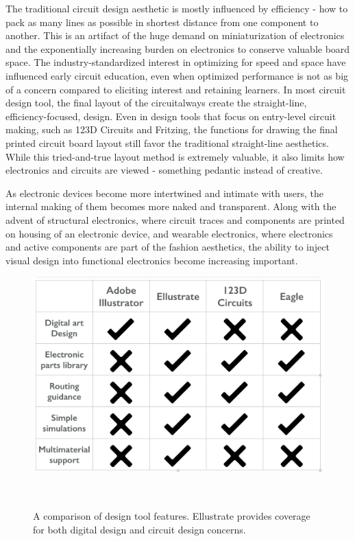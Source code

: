 \documentclass{sigchi}
\begin{document}

The traditional circuit design aesthetic is mostly influenced by efficiency - how to pack as many lines as possible in shortest distance from one component to another. 
This is an artifact of the huge demand on miniaturization of electronics and the exponentially increasing burden on electronics to conserve valuable board space. 
The industry-standardized interest in optimizing for speed and space have influenced early circuit education, even when optimized performance is not as big of a concern compared to eliciting interest and retaining learners. 
In most circuit design tool, the final layout of the circuitalways create the straight-line, efficiency-focused, design.
Even in design tools that focus on entry-level circuit making, such as 123D Circuits and Fritzing, the functions for drawing the final printed circuit board layout still favor the traditional straight-line aesthetics.
While this tried-and-true layout method is extremely valuable, it also limits how electronics and circuits are viewed - something pedantic instead of creative. 

As electronic devices become more intertwined and intimate with users, the internal making of them becomes more naked and transparent.
Along with the advent of structural electronics, where circuit traces and components are printed on housing of an electronic device, and wearable electronics, where electronics and active components are part of the fashion aesthetics, the ability to inject visual design into functional electronics become increasing important.
\begin{figure}[t]
\centering
  \includegraphics[width=1\columnwidth]{figures/Table_1}
  \caption{A comparison of design tool features. Ellustrate provides coverage for both digital design and circuit design concerns. }~\label{fig:comparison_table}
  \vspace{-16pt}
\end{figure}
\end{document}
